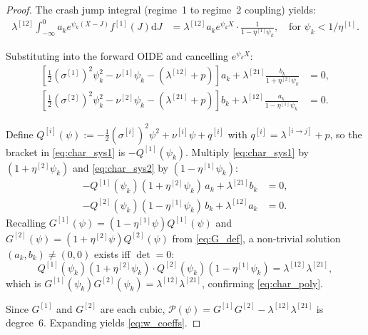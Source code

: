 \documentclass[11pt,a4paper]{article}
\numberwithin{equation}{section}
\newcommand{\dd}{\mathrm{d}}
\begin{document}
\begin{appendices}
\begin{proof}
The crash jump integral (regime~1 to regime~2 coupling) yields:
\begin{align}
\lambda^{[12]}\!\int_{-\infty}^0 a_k e^{\psi_k(X-J)} f^{[1]}(J) \dd J &= \lambda^{[12]} a_k e^{\psi_k X} \cdot \frac{1}{1 - \eta^{[1]}\psi_k}, \quad \text{for } \psi_k < 1/\eta^{[1]}.
\end{align}

Substituting into the forward OIDE and cancelling $e^{\psi_k X}$:
\begin{align}
\left[\tfrac{1}{2}(\sigma^{[1]})^2\psi_k^2 - \nu^{[1]}\psi_k - (\lambda^{[12]}+p)\right] a_k + \lambda^{[21]} \frac{b_k}{1+\eta^{[2]}\psi_k} &= 0, \label{eq:char_sys1} \\
\left[\tfrac{1}{2}(\sigma^{[2]})^2\psi_k^2 - \nu^{[2]}\psi_k - (\lambda^{[21]}+p)\right] b_k + \lambda^{[12]} \frac{a_k}{1-\eta^{[1]}\psi_k} &= 0. \label{eq:char_sys2}
\end{align}

Define $Q^{[i]}(\psi) := -\tfrac{1}{2}(\sigma^{[i]})^2\psi^2 + \nu^{[i]}\psi + q^{[i]}$ with $q^{[i]} = \lambda^{[i\to j]} + p$, so the bracket in \eqref{eq:char_sys1} is $-Q^{[1]}(\psi_k)$. Multiply \eqref{eq:char_sys1} by $(1+\eta^{[2]}\psi_k)$ and \eqref{eq:char_sys2} by $(1-\eta^{[1]}\psi_k)$:
\begin{align}
-Q^{[1]}(\psi_k)(1+\eta^{[2]}\psi_k) \, a_k + \lambda^{[21]} b_k &= 0, \label{eq:Gb_sys1} \\
-Q^{[2]}(\psi_k)(1-\eta^{[1]}\psi_k) \, b_k + \lambda^{[12]} a_k &= 0. \label{eq:Gb_sys2}
\end{align}
Recalling $G^{[1]}(\psi) = (1-\eta^{[1]}\psi)Q^{[1]}(\psi)$ and $G^{[2]}(\psi) = (1+\eta^{[2]}\psi)Q^{[2]}(\psi)$ from \eqref{eq:G_def}, a non-trivial solution $(a_k, b_k) \neq (0,0)$ exists iff $\det = 0$:
\begin{equation}
Q^{[1]}(\psi_k)(1+\eta^{[2]}\psi_k) \cdot Q^{[2]}(\psi_k)(1-\eta^{[1]}\psi_k) = \lambda^{[12]}\lambda^{[21]},
\end{equation}
which is $G^{[1]}(\psi_k) G^{[2]}(\psi_k) = \lambda^{[12]}\lambda^{[21]}$, confirming \eqref{eq:char_poly}.

Since $G^{[1]}$ and $G^{[2]}$ are each cubic, $\mathcal{P}(\psi) = G^{[1]}G^{[2]} - \lambda^{[12]}\lambda^{[21]}$ is degree~6. Expanding yields \eqref{eq:w_coeffs}.


\end{proof}
\end{appendices}
\end{document}
